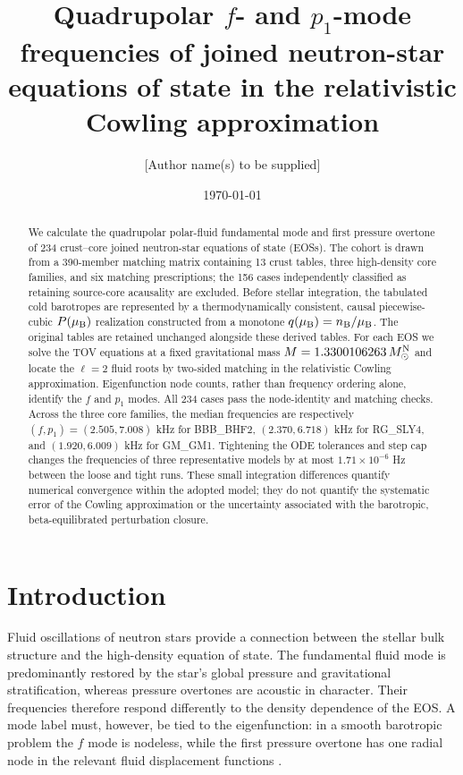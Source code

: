 \documentclass[aps,prd,twocolumn,superscriptaddress,nofootinbib]{revtex4-2}
\newcommand{\MsunN}{M_{\odot}^{\rm N}}
\newcommand{\mub}{\mu_{\rm B}}
\newcommand{\nb}{n_{\rm B}}
\begin{document}
\title{Quadrupolar $f$- and $p_1$-mode frequencies of joined neutron-star equations of state in the relativistic Cowling approximation}

\author{[Author name(s) to be supplied]}
\date{\today}

\begin{abstract}
We calculate the quadrupolar polar-fluid fundamental mode and first pressure overtone of 234 crust--core joined neutron-star equations of state (EOSs). The cohort is drawn from a 390-member matching matrix containing 13 crust tables, three high-density core families, and six matching prescriptions; the 156 cases independently classified as retaining source-core acausality are excluded. Before stellar integration, the tabulated cold barotropes are represented by a thermodynamically consistent, causal piecewise-cubic $P(\mub)$ realization constructed from a monotone $q(\mub)=\nb/\mub$. The original tables are retained unchanged alongside these derived tables. For each EOS we solve the TOV equations at a fixed gravitational mass $M=1.3300106263\,\MsunN$ and locate the $\ell=2$ fluid roots by two-sided matching in the relativistic Cowling approximation. Eigenfunction node counts, rather than frequency ordering alone, identify the $f$ and $p_1$ modes. All 234 cases pass the node-identity and matching checks. Across the three core families, the median frequencies are respectively $(f,p_1)=(2.505,7.008)$ kHz for BBB\_BHF2, $(2.370,6.718)$ kHz for RG\_SLY4, and $(1.920,6.009)$ kHz for GM\_GM1. Tightening the ODE tolerances and step cap changes the frequencies of three representative models by at most $1.71\times10^{-6}$ Hz between the loose and tight runs. These small integration differences quantify numerical convergence within the adopted model; they do not quantify the systematic error of the Cowling approximation or the uncertainty associated with the barotropic, beta-equilibrated perturbation closure.
\end{abstract}

\maketitle

\section{Introduction}

Fluid oscillations of neutron stars provide a connection between the stellar bulk structure and the high-density equation of state. The fundamental fluid mode is predominantly restored by the star's global pressure and gravitational stratification, whereas pressure overtones are acoustic in character. Their frequencies therefore respond differently to the density dependence of the EOS. A mode label must, however, be tied to the eigenfunction: in a smooth barotropic problem the $f$ mode is nodeless, while the first pressure overtone has one radial node in the relevant fluid displacement functions \cite{Kokkotas1996,Finn1988}.
\end{document}
